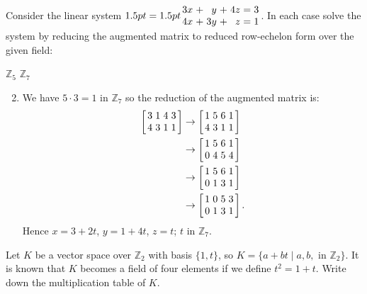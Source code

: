\begin{multicols}{2}
\begin{ex}
Consider the linear system $\arraycolsep=1.5pt \begin{array}{rrrrrrr}
3x & + & y & + & 4z & = & 3 \\
4x & + & 3y & + & z & = & 1 
\end{array}$. In each case solve the system by reducing the augmented matrix to reduced row-echelon form over the given field:

\begin{exenumerate}
\exitem $\mathbb{Z}_5$
\exitem $\mathbb{Z}_7$
\end{exenumerate}
\begin{sol}
\begin{enumerate}[label={\alph*.}]
\setcounter{enumi}{1}
\item We have $5 \cdot 3 = 1$ in $\mathbb{Z}_{7}$ so the reduction of the augmented matrix is:
\begin{align*}
\leftB \begin{array}{rrrr}
3 & 1 & 4 & 3 \\
4 & 3 & 1 & 1 
\end{array}\rightB & \rightarrow  \leftB \begin{array}{rrrr}
1 & 5 & 6 & 1 \\
4 & 3 & 1 & 1 
\end{array}\rightB \\ & \rightarrow  \leftB \begin{array}{rrrr}
1 & 5 & 6 & 1 \\
0 & 4 & 5 & 4 
\end{array}\rightB \\ & \rightarrow  \leftB \begin{array}{rrrr}
1 & 5 & 6 & 1 \\
0 & 1 & 3 & 1 
\end{array}\rightB \\ & \rightarrow  \leftB \begin{array}{rrrr}
1 & 0 & 5 & 3 \\
0 & 1 & 3 & 1 
\end{array}\rightB.
\end{align*}
Hence $x = 3 + 2t$, $y = 1 + 4t$, $z = t$; $t$ in $\mathbb{Z}_{7}$.

\end{enumerate}
\end{sol}
\end{ex}


\begin{ex}
Let $K$ be a vector space over $\mathbb{Z}_2$ with basis $\{1, t\}$, so $K = \{a + bt \mid a, b, \mbox{ in } \mathbb{Z}_2\}$. It is known that $K$ becomes a field of four elements if we define $t^{2} = 1 + t$. Write down the multiplication table of $K$.
\end{ex}


\end{multicols}
